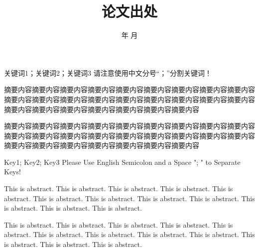\documentclass[supercite]{HustGraduTrans}
\title{论文出处} %
\date{\number\year 年 \number\month 月} %
\begin{document}
    \maketitle
    
    
    
    \begin{cnabstract}{关键词1；关键词2；关键词3}
        请注意使用中文分号“；”分割关键词！
        
        摘要内容摘要内容摘要内容摘要内容摘要内容摘要内容摘要内容摘要内容摘要内容摘要内容摘要内容摘要内容摘要内容摘要内容摘要内容摘要内容摘要内容摘要内容摘要内容摘要内容摘要内容摘要内容摘要内容摘要内容摘要内容
        
        摘要内容摘要内容摘要内容摘要内容摘要内容摘要内容摘要内容摘要内容摘要内容摘要内容摘要内容摘要内容摘要内容摘要内容摘要内容摘要内容摘要内容摘要内容摘要内容摘要内容摘要内容摘要内容摘要内容摘要内容摘要内容
    \end{cnabstract}
    \begin{enabstract}{Key1; Key2; Key3}
        Please Use English Semicolon and a Space "; " to Separate  Keys! 
        
        This is abstract. This is abstract. This is abstract. This is abstract. This is abstract. This is abstract. This is abstract. This is abstract. This is abstract. This is abstract. This is abstract. This is abstract. 
        
        This is abstract. This is abstract. This is abstract. This is abstract. This is abstract. This is abstract. This is abstract. This is abstract. This is abstract. This is abstract. This is abstract. This is abstract. 
    \end{enabstract}
\end{document}
